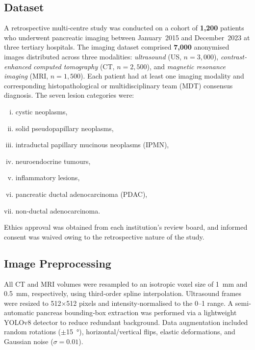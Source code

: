 \documentclass[a4paper, fleqn]{cas-dc}
\begin{document}
    \subsection{Dataset}
    A retrospective multi‐centre study was conducted on a cohort of \textbf{1,200}
    patients who underwent pancreatic imaging between January~2015 and December~2023
    at three tertiary hospitals. The imaging dataset comprised \textbf{7,000}
    anonymised images distributed across three modalities: \textit{ultrasound} (US,
    $n=3,000$), \textit{contrast‐enhanced computed tomography} (CT, $n=2,500$), and
    \textit{magnetic resonance imaging} (MRI, $n=1,500$). Each patient had at
    least one imaging modality and corresponding histopathological or
    multidisciplinary team (MDT) consensus diagnosis. The seven lesion categories
    were:
    \begin{enumerate}[i)]
        \item cystic neoplasms,\quad

        \item solid pseudopapillary neoplasms,\quad

        \item intraductal papillary mucinous neoplasms (IPMN),\quad

        \item neuroendocrine tumours,\quad

        \item inflammatory lesions,\quad

        \item pancreatic ductal adenocarcinoma (PDAC),\quad

        \item non‐ductal adenocarcinoma.
    \end{enumerate}
    Ethics approval was obtained from each institution's review board, and informed
    consent was waived owing to the retrospective nature of the study.

    \subsection{Image Preprocessing}
    All CT and MRI volumes were resampled to an isotropic voxel size of \SI{1}{\milli\metre}
    and \SI{0.5}{\milli\metre}, respectively, using third‐order spline interpolation.
    Ultrasound frames were resized to \num{512}$\times$\num{512} pixels and
    intensity‐normalised to the \num{0}–\num{1} range. A semi‐automatic pancreas
    bounding‐box extraction was performed via a lightweight YOLOv8 detector to reduce
    redundant background. Data augmentation included random rotations ($\pm$\SI{15}{\degree}),
    horizontal/vertical flips, elastic deformations, and Gaussian noise ($\sigma=
    0.01$).
\end{document}
